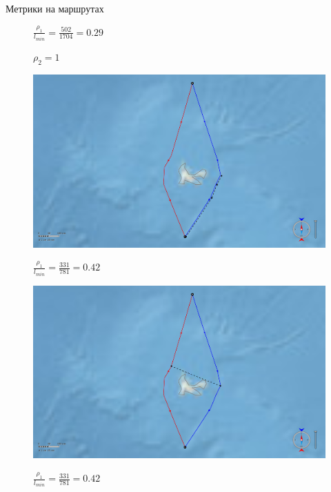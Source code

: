 \documentclass[russian, hyperref={unicode}]{beamer}
\theoremstyle{definition}
\begin{document}
\begin{frame}{Метрики на маршрутах}
{\begin{figure}
            $\frac{\rho_1}{l_{min}} = \frac{502}{1704} = 0.29$

            $\rho_2 = 1$
        \end{figure}
    }
     {
        \begin{figure}
            \includegraphics[width=.95\textwidth]{Solution/metrics/1-uncertain-2-dissimilar-gclosest}
            
            $\frac{\rho_1}{l_{min}} = \frac{331}{781} = 0.42$
        \end{figure}
    }
     {
        \begin{figure}
            \includegraphics[width=.9\textwidth]{Solution/metrics/1-uncertain-2-dissimilar-closest}
            
            $\frac{\rho_1}{l_{min}} = \frac{331}{781} = 0.42$


\end{figure}}
\end{frame}
\end{document}
